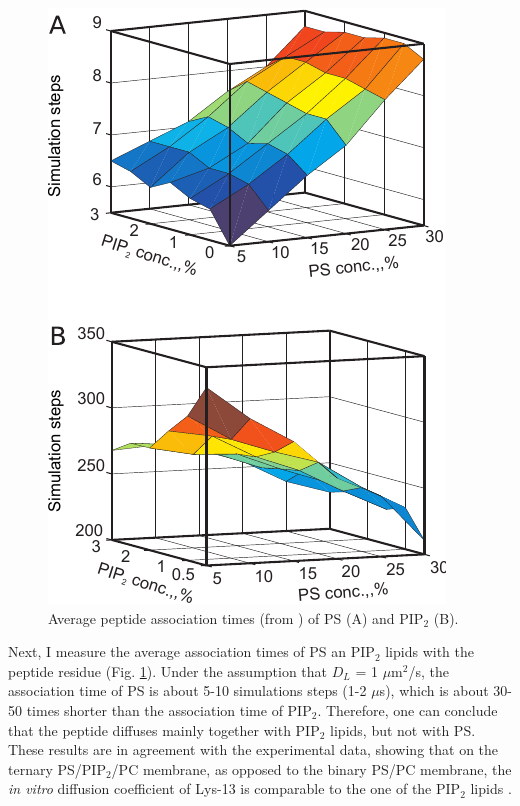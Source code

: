 \begin{figure}[!ht]
\begin{center}
  \includegraphics[scale=1.4]{../figures/lipid_association_times.pdf}
\end{center}
 \caption[Average peptide association times of PS and PIP$_2$]{Average peptide association times (from \cite{Kiselev2011}) of PS (A) and PIP$_2$ (B).}
\label{fig:lipid_association_times}
\end{figure}

Next, I measure the average association times of PS an PIP$_2$ lipids with the peptide residue (Fig. \ref{fig:lipid_association_times}). Under the assumption that $D_L$ = 1 $\mu$m$^2$/s, the association time of PS is about 5-10 simulations steps (1-2 $\mu$s), which is about 30-50 times shorter than the association time of PIP$_2$. Therefore, one can conclude that the peptide diffuses mainly together with PIP$_2$ lipids, but not with PS. These results are in agreement with the experimental data, showing that on the ternary PS/PIP$_2$/PC membrane, as opposed to the binary PS/PC membrane, the \emph{in vitro} diffusion coefficient of Lys-13 is comparable to the one of the PIP$_2$ lipids \cite{Golebiewska2006}.

